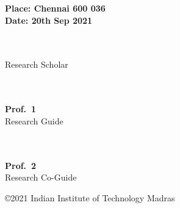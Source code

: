 \hspace*{-0.25in}
\parbox{2.5in}{
	\noindent \bf Place: Chennai 600 036\\
	\noindent \bf Date: 20th Sep 2021 \\ 
}
\hspace*{1.0in}
\parbox{2.5in}{
			\noindent \\
	\noindent \textbf{\MyAuthor} \\
	\noindent Research Scholar \\
}
\hspace*{3.55in}
\parbox{2.5in}{
	\noindent \\
	\noindent \\
	\noindent \textbf{Prof.~1} \\
	\noindent Research Guide \\ %
}
\hspace*{3.55in}
\parbox{2.5in}{
	\noindent \\
	\noindent \\
	\noindent \textbf{Prof.~2} \\
	\noindent Research Co-Guide \\ %
}



\vfill
\raggedbottom
\noindent
\copyright 2021 Indian Institute of Technology Madras



